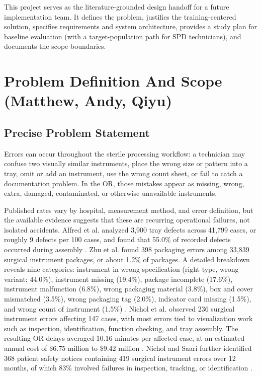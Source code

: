 \documentclass[10pt,a4paper]{article}
\begin{document}
This project serves as the literature-grounded design handoff
for a future implementation team. It defines the problem, justifies the
training-centered solution, specifies requirements and system architecture,
provides a study plan for baseline evaluation (with a target-population path for SPD technicians), and documents the scope boundaries.


\section{Problem Definition And Scope \hfill {\normalfont\small (Matthew, Andy, Qiyu)}}
\label{sec:problem-definition-and-scope}
\subsection{Precise Problem Statement}
\label{sec:precise-problem-statement}

Errors can occur throughout the sterile processing workflow: a technician may
confuse two visually similar instruments, place the wrong size or pattern into a
tray, omit or add an instrument, use the wrong count sheet, or fail to catch a
documentation problem. In the OR, those mistakes appear as missing, wrong,
extra, damaged, contaminated, or otherwise unavailable instruments.

Published rates vary by hospital, measurement method, and error definition, but
the available evidence suggests that these are recurring operational failures,
not isolated accidents. Alfred et al. analyzed 3,900 tray defects across 41,799
cases, or roughly 9 defects per 100 cases, and found that 55.0\% of recorded
defects occurred during assembly
\cite{alfred-et-al-2021}. Zhu et al. found
398 packaging errors among 33,839 surgical instrument packages, or about 1.2\%
of packages. A detailed breakdown reveals nine categories: instrument in wrong specification (right type, wrong variant; 44.0\%), instrument missing (19.4\%), package incomplete (17.6\%),
instrument malfunction (6.8\%), wrong packaging material (3.8\%), box and cover
mismatched (3.5\%), wrong packaging tag (2.0\%), indicator card missing (1.5\%),
and wrong count of instrument (1.5\%)
\cite{zhu-et-al-2019}. Nichol et al.
observed 236 surgical instrument errors affecting 147 cases, with most errors
tied to visualization work such as inspection, identification, function
checking, and tray assembly. The resulting OR delays averaged 10.16 minutes per
affected case, at an estimated annual cost of \$6.75 million to \$9.42 million
\cite{nichol-et-al-2024}. Nichol and Saari
further identified 368 patient safety notices containing 419 surgical instrument
errors over 12 months, of which 83\% involved failures in inspection, tracking,
or identification
\cite{nichol-and-saari-2023}.
\end{document}
